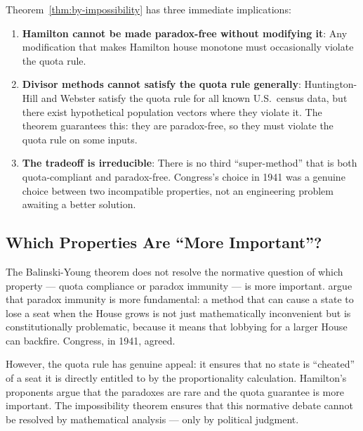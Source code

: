 Theorem~\ref{thm:by-impossibility} has three immediate implications:

\begin{enumerate}
  \item \textbf{Hamilton cannot be made paradox-free without modifying it}:
    Any modification that makes Hamilton house monotone must occasionally
    violate the quota rule.
  \item \textbf{Divisor methods cannot satisfy the quota rule generally}:
    Huntington-Hill and Webster satisfy the quota rule for all known
    U.S.\ census data, but there exist hypothetical population vectors
    where they violate it.
    The theorem guarantees this: they are paradox-free, so they must
    violate the quota rule on some inputs.
  \item \textbf{The tradeoff is irreducible}: There is no third
    ``super-method'' that is both quota-compliant and paradox-free.
    Congress's choice in 1941 was a genuine choice between two
    incompatible properties, not an engineering problem awaiting
    a better solution.
\end{enumerate}

\subsection{Which Properties Are ``More Important''?}

The Balinski-Young theorem does not resolve the normative question
of which property --- quota compliance or paradox immunity ---
is more important.
\citet{balinski1982fair} argue that paradox immunity is more fundamental:
a method that can cause a state to lose a seat when the House grows
is not just mathematically inconvenient but is constitutionally
problematic, because it means that lobbying for a larger House
can backfire.
Congress, in 1941, agreed.

However, the quota rule has genuine appeal: it ensures that no state
is ``cheated'' of a seat it is directly entitled to by the proportionality
calculation.
Hamilton's proponents argue that the paradoxes are rare and the
quota guarantee is more important.
The impossibility theorem ensures that this normative debate cannot
be resolved by mathematical analysis --- only by political judgment.
